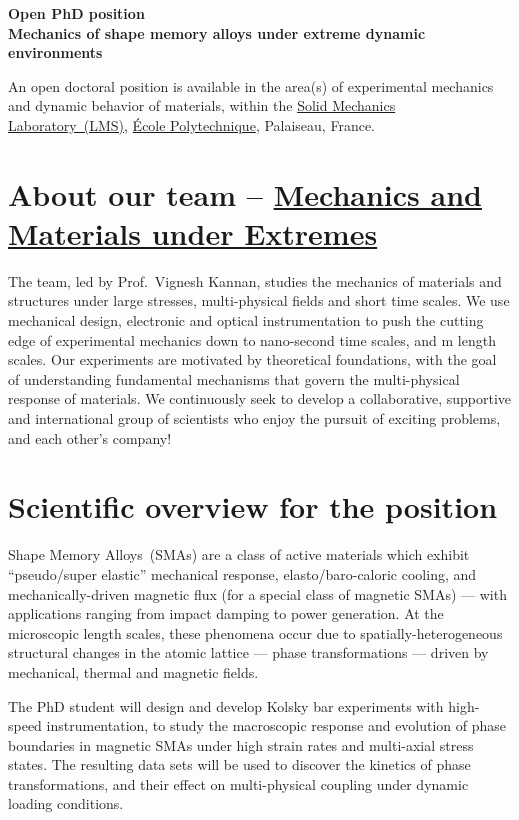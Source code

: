 \documentclass[a4paper,11pt,fleqn]{article}
\begin{document}
	\setlength{\abovedisplayskip}{2 pt}
	\setlength{\belowdisplayskip}{2 pt}
	\sffamily
	\thispagestyle{titlepage}
	\begin{center}
		\vspace*{-2.5em}
		\Large \textbf{Open PhD position \\ Mechanics of shape memory alloys under extreme dynamic environments} 
	\end{center}
	
	An open doctoral position is available in the area(s) of experimental mechanics and dynamic behavior of materials, within the \href{https://portail.polytechnique.edu/lms/en}{Solid Mechanics Laboratory~(LMS)}, \href{https://www.polytechnique.edu/en}{{\'E}cole Polytechnique}, Palaiseau, France. 
	
	\section*{About our team -- \href{https://www.vignesh-kannan.com/}{Mechanics and Materials under Extremes}}
	The team, led by Prof.~Vignesh Kannan, studies the mechanics of materials and structures under large stresses, multi-physical fields and short time scales. We use mechanical design, electronic and optical instrumentation to push the cutting edge of experimental mechanics down to nano-second time scales, and \textmu m length scales. Our experiments are motivated by theoretical foundations, with the goal of understanding fundamental mechanisms that govern the multi-physical response of materials. We continuously seek to develop a collaborative, supportive and international group of scientists who enjoy the pursuit of exciting problems, and each other's company!

	\section*{Scientific overview for the position}
	Shape Memory Alloys~(SMAs) are a class of active materials which exhibit ``pseudo/super elastic'' mechanical response, elasto/baro-caloric cooling, and mechanically-driven magnetic flux (for a special class of magnetic SMAs) --- with applications ranging from impact damping to power generation. At the microscopic length scales, these phenomena occur due to spatially-heterogeneous structural changes in the atomic lattice --- phase transformations --- driven by mechanical, thermal and magnetic fields. 
	
	The PhD student will design and develop Kolsky bar experiments with high-speed instrumentation, to study the macroscopic response and evolution of phase boundaries in magnetic SMAs under high strain rates and multi-axial stress states. The resulting data sets will be used to discover the kinetics of phase transformations, and their effect on multi-physical coupling under dynamic loading conditions. 
	
\end{document}
